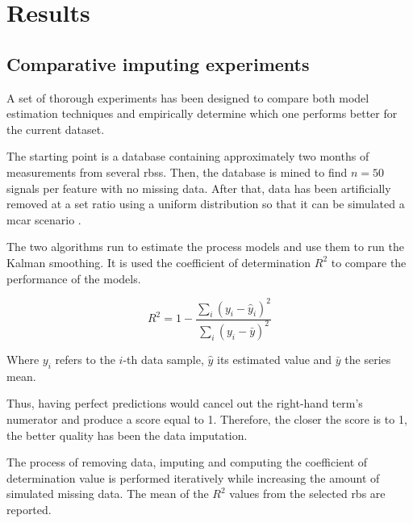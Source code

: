 

\chapter{Results}
\label{cha:results}



\section{Comparative imputing experiments}
\label{sec:imp-exps}

A set of thorough experiments has been designed to compare both model estimation techniques and empirically determine which one performs better for the current dataset.

The starting point is a database containing approximately two months of measurements from several \acp{rbs}. Then, the database is mined to find $n=50$ signals per feature with no missing data. After that, data has been artificially removed at a set ratio using a uniform distribution so that it can be simulated a \ac{mcar} scenario \cite{rantou2017missing}. 

The two algorithms run to estimate the process models and use them to run the Kalman smoothing. It is used the coefficient of determination $R^2$ to compare the performance of the models. 

\begin{equation}\label{eq:R2}
	R^2 = 1 - \frac{\sum_{i}{(y_i - \hat{y}_i)^2}}{\sum_{i}{(y_i - \bar{y})^2}}
\end{equation}

Where $y_i$ refers to the $i$-th data sample, $\hat{y}$ its estimated value and $\bar{y}$ the series mean. 

Thus, having perfect predictions would cancel out the right-hand term's numerator and produce a score equal to 1. Therefore, the closer the score is to 1, the better quality has been the data imputation.  

The process of removing data, imputing and computing the coefficient of determination value is performed iteratively while increasing the amount of simulated missing data. The mean of the $R^2$ values from the  selected \ac{rbs} are reported. 

